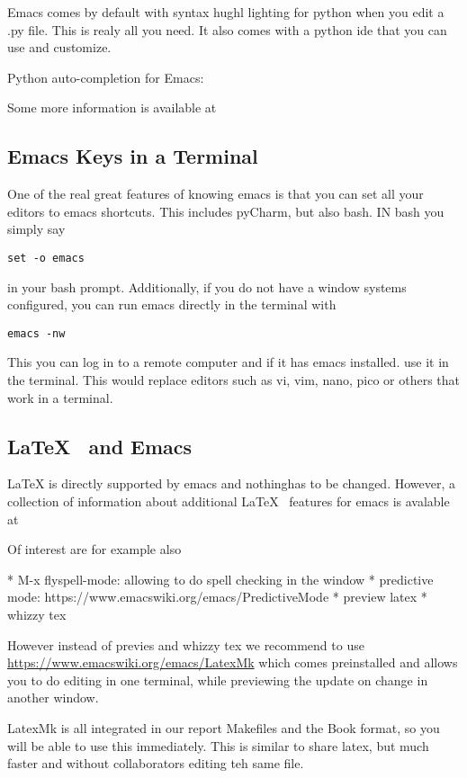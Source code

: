 Emacs comes by default with syntax hughl lighting for python when you
edit a .py file. This is realy all you need. It also comes with a
python ide that you can use and customize.

Python auto-completion for Emacs:



Some more information is available at


\subsection{Emacs Keys in a Terminal}

One of the real great features of knowing emacs is that you can set
all your editors to emacs shortcuts. This includes pyCharm, but also
bash. IN bash you simply say 

\begin{verbatim}
set -o emacs
\end{verbatim}

in your bash prompt. Additionally, if you do not have a window systems
configured, you can run emacs directly in the terminal with 

\begin{verbatim}
emacs -nw
\end{verbatim}

This you can log in to a remote computer and if it has emacs
installed. use it in the terminal. This would replace editors such as
vi, vim, nano, pico or others that work in a terminal.

\subsection{\LaTeX~ and Emacs}

LaTeX is directly supported by emacs and nothinghas to be
changed. However, a collection of information about additional \LaTeX~
features for emacs is avalable at


Of interest are for example also 

* M-x flyspell-mode: allowing to do spell checking in the window
* predictive mode: https://www.emacswiki.org/emacs/PredictiveMode
* preview latex
* whizzy tex

However instead of previes and whizzy tex we recommend to use
\url{https://www.emacswiki.org/emacs/LatexMk} which comes preinstalled
and allows you to do editing in one terminal, while previewing the
update on change in another window.

LatexMk is all integrated in our report Makefiles and the Book format,
so you will be able to use this immediately. This is similar to share
latex, but much faster and without collaborators editing teh same file.
